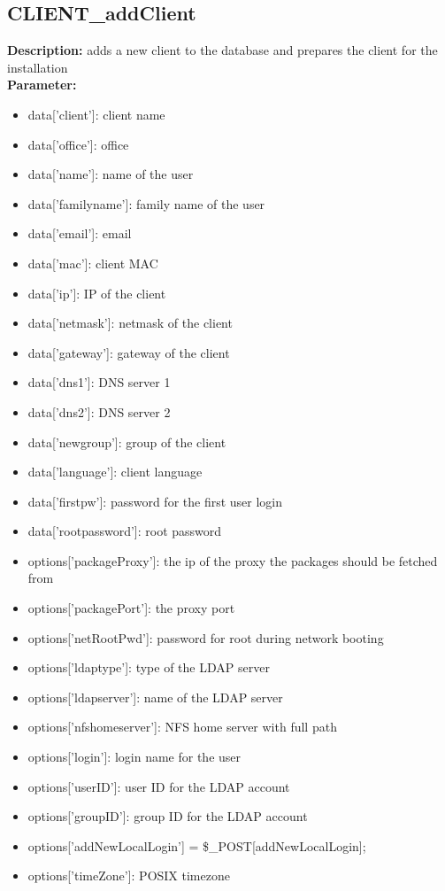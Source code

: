 \subsection{CLIENT\_addClient}
\textbf{Description:} adds a new client to the database and prepares the client for the installation\\
\textbf{Parameter:}
\begin{itemize}
\item data['client']: client name
\item data['office']: office
\item data['name']: name of the user
\item data['familyname']: family name of the user
\item data['email']: email
\item data['mac']: client MAC
\item data['ip']: IP of the client
\item data['netmask']: netmask of the client
\item data['gateway']: gateway of the client
\item data['dns1']: DNS server 1
\item data['dns2']: DNS server 2
\item data['newgroup']: group of the client
\item data['language']: client language
\item data['firstpw']: password for the first user login
\item data['rootpassword']: root password
\item options['packageProxy']: the ip of the proxy the packages should be fetched from
\item options['packagePort']: the proxy port
\item options['netRootPwd']: password for root during network booting
\item options['ldaptype']: type of the LDAP server
\item options['ldapserver']: name of the LDAP server
\item options['nfshomeserver']: NFS home server with full path
\item options['login']: login name for the user
\item options['userID']: user ID for the LDAP account
\item options['groupID']: group ID for the LDAP account
\item options['addNewLocalLogin']		= \$\_POST[addNewLocalLogin];
\item options['timeZone']: POSIX timezone

\end{itemize}
